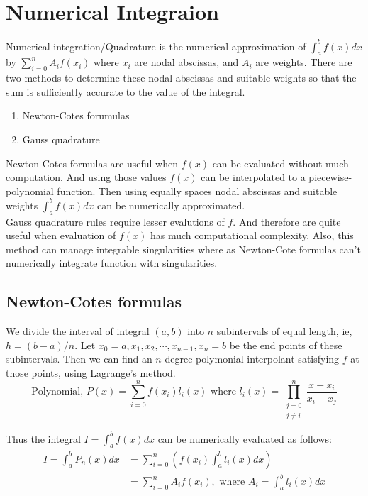 \section{Numerical Integraion}
	Numerical integration/Quadrature is the numerical approximation of $\int_a^b f(x)dx$ by $\sum_{i=0}^n A_if(x_i)$ where $x_i$ are nodal abscissas, and $A_i$ are weights. There are two methods to determine these nodal abscissas and suitable weights so that the sum is sufficiently accurate to the value of the integral.
\begin{enumerate}
	\item Newton-Cotes forumulas
	\item Gauss quadrature
\end{enumerate}

	Newton-Cotes formulas are useful when $f(x)$ can be evaluated without much computation. And using those values $f(x)$ can be interpolated to a piecewise-polynomial function. Then using equally spaces nodal abscissas and suitable weights $\int_a^b f(x)dx$ can be numerically approximated.\\

	Gauss quadrature rules require lesser evalutions of $f$. And therefore are quite useful when evaluation of $f(x)$ has much computational complexity. Also, this method can manage integrable singularities where as Newton-Cote formulas can't numerically integrate function with singularities. 

\subsection{Newton-Cotes formulas}
	We divide the interval of integral $(a,b)$ into $n$ subintervals of equal length, ie, $h = (b-a)/n$. Let $x_0 = a, x_1, x_2,\cdots,x_{n-1},x_n=b$ be the end points of these subintervals. Then we can find an $n$ degree polymonial interpolant satisfying $f$ at those points, using Lagrange's method.\\

	\[ \text{Polynomial, }P(x) = \sum_{i =0}^n f(x_i)l_i(x) \text{ where } l_i(x) = \prod_{\substack{j=0\\j\ne i}}^n \frac{x-x_i}{x_i-x_j} \]

	Thus the integral $I = \int_a^b f(x)dx$ can be numerically evaluated as follows:
\begin{align*}
	I = \int_a^b P_n(x)dx &  = \sum_{i = 0}^n \left(f(x_i) \int_a^b l_i(x)dx\right)  \\
		& = \sum_{i=0}^n A_i f(x_i), \text{ where }  A_i = \int_a^b l_i(x) dx 
\end{align*}

